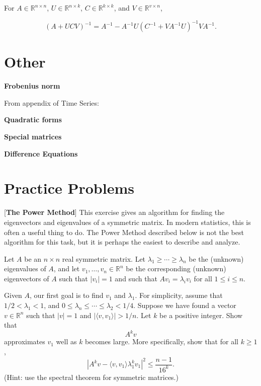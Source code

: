 \begin{theorem} For \(A \in \mathbb{R}^{n \times n}\), \(U \in \mathbb{R}^{n \times k}\), \(C \in \mathbb{R}^{k \times k}\), and \(V \in \mathbb{R}^{v \times n}\),

\[
(A + UCV)^{-1} = A^{-1} - A^{-1}U(C^{-1} + VA^{-1}U)^{-1}VA^{-1}.
\]

\end{theorem}

\begin{theorem}

\end{theorem}

\section{Other}

\textbf{Frobenius norm}

From appendix of Time Series:

\textbf{Quadratic forms}

\textbf{Special matrices}

\textbf{Difference Equations}

\section{Practice Problems}

[\textbf{The Power Method}]
This exercise gives an algorithm for finding the eigenvectors and eigenvalues of a symmetric matrix.  In modern statistics, this is often a useful thing to do.  The Power Method described below is not the best algorithm for this task, but it is perhaps the easiest to describe and analyze.

Let $A$ be an $n\times n$ real symmetric matrix.  Let $\lambda_{1}\geq\cdots\geq\lambda_{n}$ be the (unknown) eigenvalues of $A$, and let $v_{1},\ldots,v_{n}\in\mathbb{R}^{n}$ be the corresponding (unknown) eigenvectors of $A$ such that $|v_{i}|=1$ and such that $A v_{i}=\lambda_{i}v_{i}$ for all $1\leq i\leq n$.

Given $A$, our first goal is to find $v_{1}$ and $\lambda_{1}$.  For simplicity, assume that $1/2<\lambda_{1}<1$, and $0\leq \lambda_{n}\leq\cdots\leq\lambda_{2}<1/4$.  Suppose we have found a vector $v\in\mathbb{R}^{n}$ such that $|v|=1$ and $|\langle v,v_{1}\rangle|>1/n$. Let $k$ be a positive integer.  Show that
$$A^{k}v$$
approximates $v_{1}$ well as $k$ becomes large.  More specifically, show that for all $k\geq1$,
$$|A^{k}v - \langle v,v_{1}\rangle\lambda_{1}^{k}v_{1}|^{2}\leq\frac{n-1}{16^{k}}.$$
(Hint: use the spectral theorem for symmetric matrices.)

